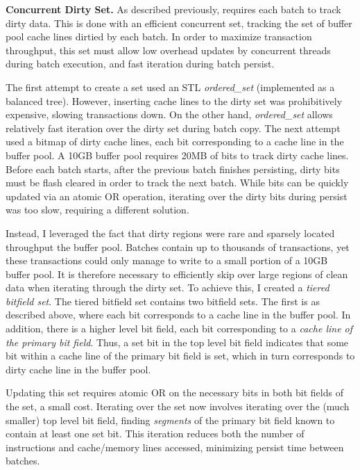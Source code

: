 \textbf{Concurrent Dirty Set.}
As described previously, \GroupCommit requires each batch to track dirty data.
This is done with an efficient concurrent set, tracking the set of buffer pool cache lines dirtied by each batch.
In order to maximize transaction throughput, this set must allow low overhead updates by concurrent threads during batch execution, and fast iteration during batch persist.

The first attempt to create a set used an STL \emph{ordered\_set} (implemented as a balanced tree).
However, inserting cache lines to the dirty set was prohibitively expensive, slowing transactions down.
On the other hand, \emph{ordered\_set} allows relatively fast iteration over the dirty set during batch copy.
The next attempt used a bitmap of dirty cache lines, each bit corresponding to a cache line in the buffer pool.
A 10GB buffer pool requires 20MB of bits to track dirty cache lines.
Before each batch starts, after the previous batch finishes persisting, dirty bits must be flash cleared in order to track the next batch.
While bits can be quickly updated via an atomic OR operation, iterating over the dirty bits during persist was too slow, requiring a different solution.

Instead, I leveraged the fact that dirty regions were rare and sparsely located throughput the buffer pool.
Batches contain up to thousands of transactions, yet these transactions could only manage to write to a small portion of a 10GB buffer pool.
It is therefore necessary to efficiently skip over large regions of clean data when iterating through the dirty set.
To achieve this, I created a \emph{tiered bitfield set}.
The tiered bitfield set contains two bitfield sets.
The first is as described above, where each bit corresponds to a cache line in the buffer pool.
In addition, there is a higher level bit field, each bit corresponding to a \emph{cache line of the primary bit field}.
Thus, a set bit in the top level bit field indicates that some bit within a cache line of the primary bit field is set, which in turn corresponds to dirty cache line in the buffer pool.

Updating this set requires atomic OR on the necessary bits in both bit fields of the set, a small cost.
Iterating over the set now involves iterating over the (much smaller) top level bit field, finding \emph{segments} of the primary bit field known to contain at least one set bit.
This iteration reduces both the number of instructions and cache/memory lines accessed, minimizing persist time between batches.

